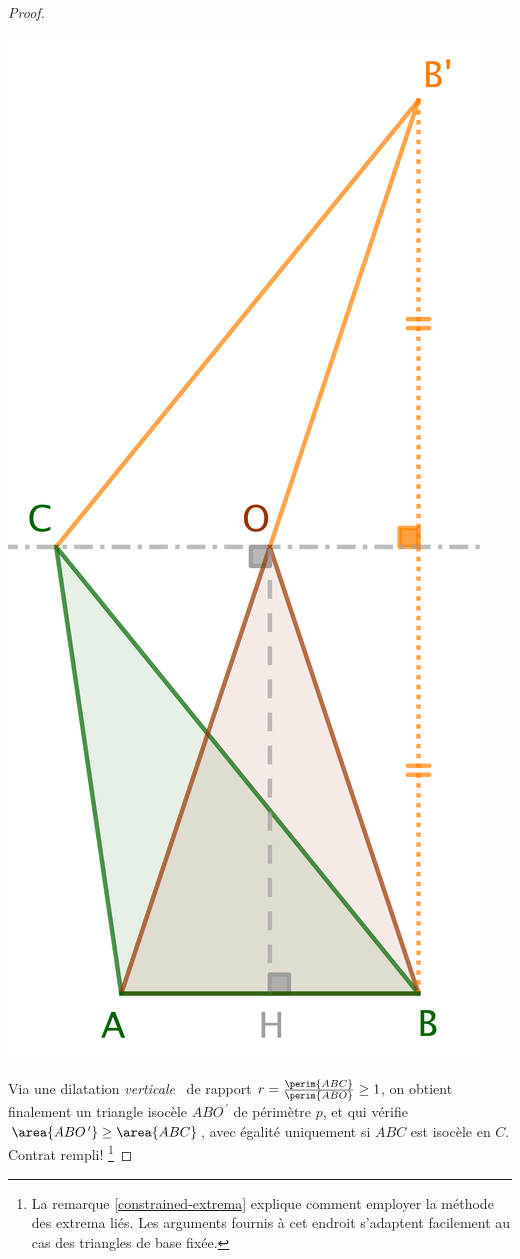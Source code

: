 \begin{proof}
	\begin{center}
		\includegraphics[scale=.4]{content/triangle-one-side-fixed/triangle-proof.png}
	\end{center}
	
	Via une dilatation \og \emph{verticale} \fg\ de rapport $r = \frac{\perim{ABC}}{\perim{ABO}} \geq 1$, on obtient finalement un triangle isocèle $ABO^{\,\prime}$ de périmètre $p$, et qui vérifie $\area{ABO^{\,\prime}} \geq \area{ABC}$, avec égalité uniquement si $ABC$ est isocèle en $C$. 
	Contrat rempli!%
	\footnote{
		La remarque \ref{constrained-extrema} explique comment employer la méthode des extrema liés. 
		Les arguments fournis à cet endroit s'adaptent facilement au cas des triangles de base fixée.
	}
\end{proof}
